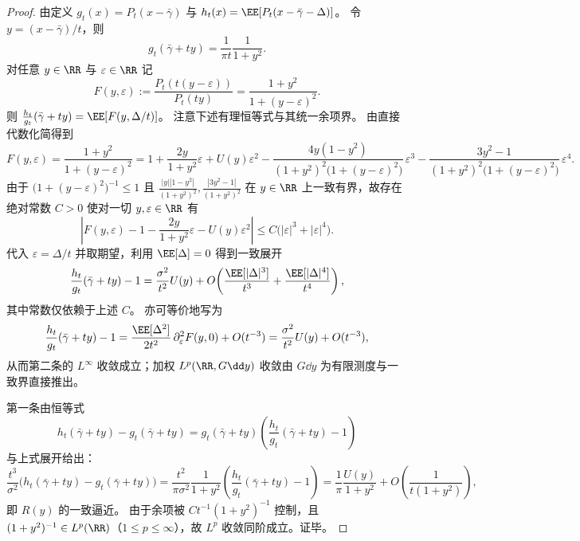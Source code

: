 \begin{proof}
由定义 \(g_t(x)=P_t(x-\bar\gamma)\) 与 \(h_t(x)=\EE[P_t(x-\bar\gamma-\Delta)]\)。
令 \(y=(x-\bar\gamma)/t\)，则
\[
g_t(\bar\gamma+ty)=\frac{1}{\pi t}\frac{1}{1+y^2}.
\]
对任意 \(y\in\RR\) 与 \(\varepsilon\in\RR\) 记
\[
F(y,\varepsilon):=\frac{P_t(t(y-\varepsilon))}{P_t(ty)}=\frac{1+y^2}{1+(y-\varepsilon)^2}.
\]
则 \(\frac{h_t}{g_t}(\bar\gamma+ty)=\EE[F(y,\Delta/t)]\)。
注意下述有理恒等式与其统一余项界。
由直接代数化简得到
\[
F(y,\varepsilon)
=\frac{1+y^2}{1+(y-\varepsilon)^2}
=1+\frac{2y}{1+y^2}\varepsilon+U(y)\varepsilon^2
-\frac{4y(1-y^2)}{(1+y^2)^2\bigl(1+(y-\varepsilon)^2\bigr)}\,\varepsilon^3
-\frac{3y^2-1}{(1+y^2)^2\bigl(1+(y-\varepsilon)^2\bigr)}\,\varepsilon^4.
\]
由于 \(\bigl(1+(y-\varepsilon)^2\bigr)^{-1}\le 1\) 且
\(
\frac{|y||1-y^2|}{(1+y^2)^2},\frac{|3y^2-1|}{(1+y^2)^2}
\)
在 \(y\in\RR\) 上一致有界，故存在绝对常数 \(C>0\) 使对一切 \(y,\varepsilon\in\RR\) 有
\[
\left|F(y,\varepsilon)-1-\frac{2y}{1+y^2}\varepsilon-U(y)\varepsilon^2\right|
\le C\bigl(|\varepsilon|^3+|\varepsilon|^4\bigr).
\]
代入 \(\varepsilon=\Delta/t\) 并取期望，利用 \(\EE[\Delta]=0\) 得到一致展开
\[
\frac{h_t}{g_t}(\bar\gamma+ty)-1
=\frac{\sigma^2}{t^2}U(y)+O\!\left(\frac{\EE[|\Delta|^3]}{t^3}+\frac{\EE[|\Delta|^4]}{t^4}\right),
\]
其中常数仅依赖于上述 \(C\)。
亦可等价地写为
\[
\frac{h_t}{g_t}(\bar\gamma+ty)-1
=\frac{\EE[\Delta^2]}{2t^2}\,\partial_\varepsilon^2F(y,0)+O(t^{-3})
=\frac{\sigma^2}{t^2}U(y)+O(t^{-3}),
\]
从而第二条的 \(L^\infty\) 收敛成立；加权 \(L^p(\RR,G\dd y)\) 收敛由 \(G\dd y\) 为有限测度与一致界直接推出。
\par
第一条由恒等式
\[
h_t(\bar\gamma+ty)-g_t(\bar\gamma+ty)=g_t(\bar\gamma+ty)\left(\frac{h_t}{g_t}(\bar\gamma+ty)-1\right)
\]
与上式展开给出：
\[
\frac{t^3}{\sigma^2}\bigl(h_t(\bar\gamma+ty)-g_t(\bar\gamma+ty)\bigr)
=\frac{t^2}{\pi\sigma^2}\frac{1}{1+y^2}\left(\frac{h_t}{g_t}(\bar\gamma+ty)-1\right)
=\frac{1}{\pi}\frac{U(y)}{1+y^2}+O\!\left(\frac{1}{t(1+y^2)}\right),
\]
即 \(R(y)\) 的一致逼近。
由于余项被 \(Ct^{-1}(1+y^2)^{-1}\) 控制，且 \((1+y^2)^{-1}\in L^p(\RR)\)（\(1\le p\le\infty\)），故 \(L^p\) 收敛同阶成立。证毕。
\end{proof}


